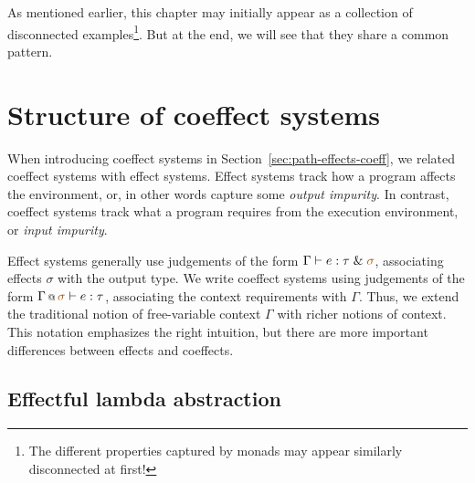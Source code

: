 \noindent
As mentioned earlier, this chapter may initially appear as a collection of disconnected 
examples\footnote{The different properties captured by monads may appear similarly 
disconnected at first!}. But at the end, we will see that they share a common pattern.


%	                                                               
%

\section{Structure of coeffect systems}
\label{sec:applications-structure}

When introducing coeffect systems in Section~\ref{sec:path-effects-coeff}, we related coeffect systems
with effect systems. Effect systems track how a program affects the environment, or, in other words 
capture some \emph{output impurity}. In contrast, coeffect systems track what a program requires from 
the execution environment, or \emph{input impurity}.

Effect systems generally use judgements of the form $\Gamma \vdash e : \tau \;\&\; \aclrd{\sigma}$, 
associating effects $\sigma$ with the output type. We write coeffect 
systems using judgements of the form $\coctx{\Gamma}{\aclrd{\sigma}} \vdash e : \tau$, associating
the context requirements with $\Gamma$. Thus, we extend the traditional notion of free-variable
context $\Gamma$ with richer notions of context. This notation emphasizes the right intuition, 
but there are more important differences between effects and coeffects.


\subsection{Effectful lambda abstraction}
\label{sec:applications-structure-lam}

